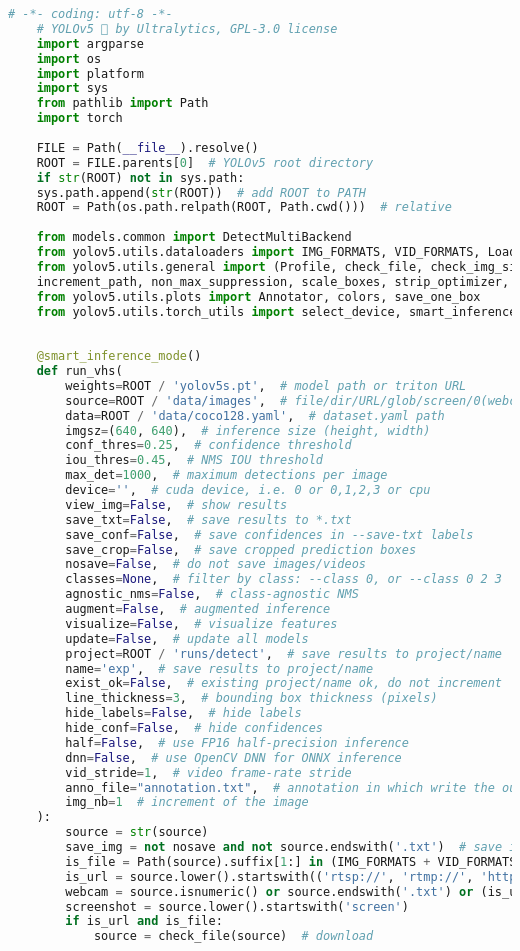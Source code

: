 \begin{lstlisting}[language=Python]
	# -*- coding: utf-8 -*-
	# YOLOv5 🚀 by Ultralytics, GPL-3.0 license
	import argparse
	import os
	import platform
	import sys
	from pathlib import Path
	import torch
	
	FILE = Path(__file__).resolve()
	ROOT = FILE.parents[0]  # YOLOv5 root directory
	if str(ROOT) not in sys.path:
	sys.path.append(str(ROOT))  # add ROOT to PATH
	ROOT = Path(os.path.relpath(ROOT, Path.cwd()))  # relative
	
	from models.common import DetectMultiBackend
	from yolov5.utils.dataloaders import IMG_FORMATS, VID_FORMATS, LoadImages, LoadScreenshots, LoadStreams
	from yolov5.utils.general import (Profile, check_file, check_img_size, check_imshow, cv2,
	increment_path, non_max_suppression, scale_boxes, strip_optimizer, xyxy2xywh)
	from yolov5.utils.plots import Annotator, colors, save_one_box
	from yolov5.utils.torch_utils import select_device, smart_inference_mode
	
	
	@smart_inference_mode()
	def run_vhs(
		weights=ROOT / 'yolov5s.pt',  # model path or triton URL
		source=ROOT / 'data/images',  # file/dir/URL/glob/screen/0(webcam)
		data=ROOT / 'data/coco128.yaml',  # dataset.yaml path
		imgsz=(640, 640),  # inference size (height, width)
		conf_thres=0.25,  # confidence threshold
		iou_thres=0.45,  # NMS IOU threshold
		max_det=1000,  # maximum detections per image
		device='',  # cuda device, i.e. 0 or 0,1,2,3 or cpu
		view_img=False,  # show results
		save_txt=False,  # save results to *.txt
		save_conf=False,  # save confidences in --save-txt labels
		save_crop=False,  # save cropped prediction boxes
		nosave=False,  # do not save images/videos
		classes=None,  # filter by class: --class 0, or --class 0 2 3
		agnostic_nms=False,  # class-agnostic NMS
		augment=False,  # augmented inference
		visualize=False,  # visualize features
		update=False,  # update all models
		project=ROOT / 'runs/detect',  # save results to project/name
		name='exp',  # save results to project/name
		exist_ok=False,  # existing project/name ok, do not increment
		line_thickness=3,  # bounding box thickness (pixels)
		hide_labels=False,  # hide labels
		hide_conf=False,  # hide confidences
		half=False,  # use FP16 half-precision inference
		dnn=False,  # use OpenCV DNN for ONNX inference
		vid_stride=1,  # video frame-rate stride
		anno_file="annotation.txt",  # annotation in which write the output
		img_nb=1  # increment of the image
	):
		source = str(source)
		save_img = not nosave and not source.endswith('.txt')  # save inference images
		is_file = Path(source).suffix[1:] in (IMG_FORMATS + VID_FORMATS)
		is_url = source.lower().startswith(('rtsp://', 'rtmp://', 'http://', 'https://'))
		webcam = source.isnumeric() or source.endswith('.txt') or (is_url and not is_file)
		screenshot = source.lower().startswith('screen')
		if is_url and is_file:
			source = check_file(source)  # download
	

\end{lstlisting}
